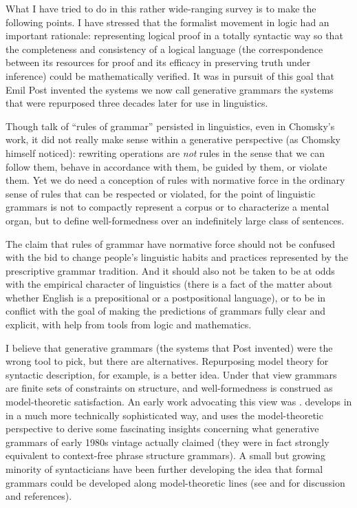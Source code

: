 \documentclass[output=paper]{langscibook}
\begin{document}
What I have tried to do in this rather wide-ranging survey is to make the following points. I have stressed that the formalist movement in logic had an important rationale: representing logical proof in a totally syntactic way so that the completeness and consistency of a logical language (the correspondence between its resources for proof and its efficacy in preserving truth under inference) could be mathematically verified.  It was in pursuit of this goal that Emil Post invented the systems we now call generative grammars the systems that were repurposed three decades later for use in linguistics.

Though talk of ``rules of grammar'' persisted in linguistics, even in Chomsky's work, it did not really make sense within a generative perspective (as Chomsky himself noticed): rewriting operations are \emph{not} rules in the sense that we can follow them, behave in accordance with them, be guided by them, or violate them.  Yet we do need a conception of rules with normative force in the ordinary sense of rules that can be respected or violated, for the point of linguistic grammars is not to compactly represent a corpus or to characterize a mental organ, but to define well-formedness over an indefinitely large class of sentences.

The claim that rules of grammar have normative force should not be confused with the bid to change people's linguistic habits and practices represented by the prescriptive grammar tradition. And it should also not be taken to be at odds with the empirical character of linguistics (there is a fact of the matter about whether English is a prepositional or a postpositional language), or to be in conflict with the goal of making the predictions of grammars fully clear and explicit, with help from tools from logic and mathematics.

I believe that generative grammars (the systems that Post invented) were the wrong tool to pick, but there are alternatives.  Repurposing model theory for syntactic description, for example, is a better idea. Under that view grammars are finite sets of constraints on structure, and well-formedness is construed as model-theoretic satisfaction. An early work advocating this view was \citet{JohnPost80}. \citet{Rogers98} develops in in a much more technically sophisticated way, and uses the model-theoretic perspective to derive some fascinating insights concerning what generative grammars of early 1980s vintage actually claimed (they were in fact strongly equivalent to context-free phrase structure grammars). A small but growing minority of syntacticians have been further developing the idea that formal grammars could be developed along model-theoretic lines (see \citealt{PullScho01LACL} and \citealt{Pullum13} for discussion and references).
\end{document}
